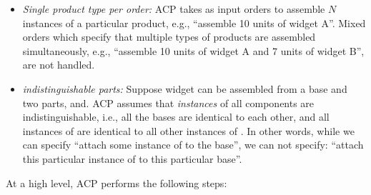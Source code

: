 \begin{itemize}

\item {\em Single product type per order:}
ACP takes as input orders to assemble $N$ instances of a particular product, e.g., ``assemble 10 units of widget A''.
Mixed orders which specify that multiple types of products are assembled simultaneously, e.g., ``assemble 10 units of widget A and 7 units of widget B'', are not handled.



\item {\em indistinguishable parts:}
Suppose widget can be assembled from a base and two parts,  and.
ACP assumes that 
{\em instances} of all components are indistinguishable, i.e., all the bases are
identical to each other, and all instances of  are identical to
all other instances of . In other words, while we can specify ``attach some instance of  to the base'', we can not specify:
``attach this particular instance of  to this particular base''.


\end{itemize}

At a high level, ACP performs the following steps:

